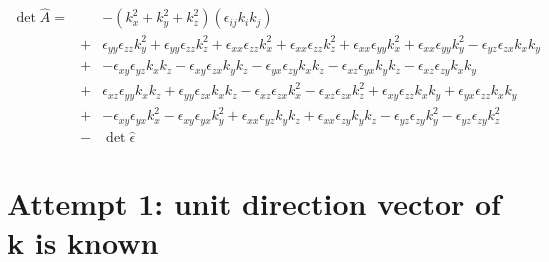 \documentclass[12pt,a4paper,twoside,openright,BCOR10mm,headsepline,titlepage,abstracton,chapterprefix,final]{scrreprt}
\newcommand\wavenumber{k}
\newcommand\Tensor[1]{\hat{#1}}
\newcommand\permittivity{\Tensor{\epsilon}}
\newcommand\scalarpermittivity{\epsilon}
\begin{document}
\begin{eqnarray}
 \det \hat{A} =&& 
   - ( \wavenumber_x^2 + \wavenumber_y^2 + \wavenumber_z^2 )
     ( \scalarpermittivity_{ij} \wavenumber_i \wavenumber_j )
 \nonumber\\
 &+& 
       \scalarpermittivity_{yy} \scalarpermittivity_{zz} \wavenumber_y^2 
    +  \scalarpermittivity_{yy} \scalarpermittivity_{zz} \wavenumber_z^2 
    +  \scalarpermittivity_{xx} \scalarpermittivity_{zz} \wavenumber_x^2 + \scalarpermittivity_{xx} \scalarpermittivity_{zz} \wavenumber_z^2 + \scalarpermittivity_{xx} \scalarpermittivity_{yy} \wavenumber_x^2 + \scalarpermittivity_{xx} \scalarpermittivity_{yy} \wavenumber_y^2 
    -  \scalarpermittivity_{yz} \scalarpermittivity_{zx} \wavenumber_x \wavenumber_y 
 \nonumber\\&+&
    -  \scalarpermittivity_{xy} \scalarpermittivity_{yz} \wavenumber_x \wavenumber_z - \scalarpermittivity_{xy} \scalarpermittivity_{zx} \wavenumber_y \wavenumber_z  
    -  \scalarpermittivity_{yx} \scalarpermittivity_{zy} \wavenumber_x \wavenumber_z  
    -  \scalarpermittivity_{xz} \scalarpermittivity_{yx} \wavenumber_y \wavenumber_z - \scalarpermittivity_{xz} \scalarpermittivity_{zy} \wavenumber_x \wavenumber_y  
 \nonumber\\&+&
       \scalarpermittivity_{xz} \scalarpermittivity_{yy} \wavenumber_x \wavenumber_z + \scalarpermittivity_{yy} \scalarpermittivity_{zx} \wavenumber_x \wavenumber_z 
    -  \scalarpermittivity_{xz} \scalarpermittivity_{zx} \wavenumber_x^2 
    -  \scalarpermittivity_{xz} \scalarpermittivity_{zx} \wavenumber_z^2 
    +  \scalarpermittivity_{xy} \scalarpermittivity_{zz} \wavenumber_x \wavenumber_y + \scalarpermittivity_{yx} \scalarpermittivity_{zz} \wavenumber_x \wavenumber_y 
 \nonumber\\&+&
    -  \scalarpermittivity_{xy} \scalarpermittivity_{yx} \wavenumber_x^2 
    -  \scalarpermittivity_{xy} \scalarpermittivity_{yx} \wavenumber_y^2 
    +  \scalarpermittivity_{xx} \scalarpermittivity_{yz} \wavenumber_y \wavenumber_z + \scalarpermittivity_{xx} \scalarpermittivity_{zy} \wavenumber_y \wavenumber_z  
    -  \scalarpermittivity_{yz} \scalarpermittivity_{zy} \wavenumber_y^2 
    -  \scalarpermittivity_{yz} \scalarpermittivity_{zy} \wavenumber_z^2 
 \nonumber\\[2ex]
 &-& \det \permittivity 
\end{eqnarray}

\section{Attempt 1: unit direction vector of k is known}
\end{document}

